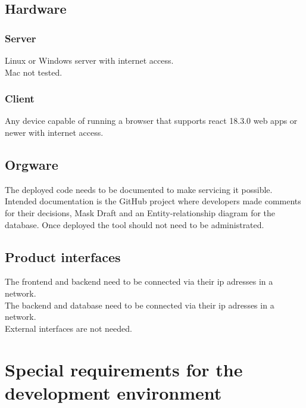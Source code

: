 \documentclass[]{article}
\begin{document}
	\subsection{Hardware}
		\subsubsection{Server}
			Linux or Windows server with internet access.\\
			Mac not tested.
		\subsubsection{Client}
			Any device capable of running a browser that supports react 18.3.0 web apps or newer with internet access.
	\subsection{Orgware}
		The deployed code needs to be documented to make servicing it possible. Intended documentation is the GitHub project where developers made comments for their decisions, Mask Draft and an Entity-relationship diagram for the database. Once deployed the tool should not need to be administrated.
	\subsection{Product interfaces}
		The frontend and backend need to be connected via their ip adresses in a network.\\
		The backend and database need to be connected via their ip adresses in a network.\\
		External interfaces are not needed.
\newpage
\section{Special requirements for the development environment}
\end{document}
